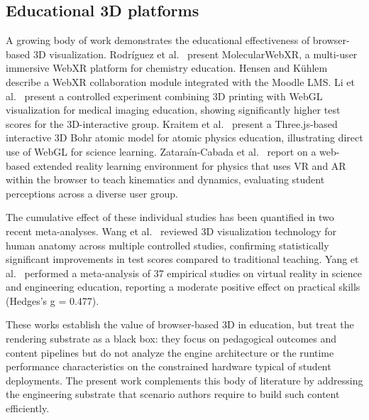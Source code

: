 \subsection{Educational 3D platforms}
A growing body of work demonstrates the educational effectiveness of browser-based 3D visualization. Rodríguez et al.~\cite{Rodrguez2021} present MolecularWebXR, a multi-user immersive WebXR platform for chemistry education. Hensen and Kühlem~\cite{Hensen2023} describe a WebXR collaboration module integrated with the Moodle LMS. Li et al.~\cite{Li2021} present a controlled experiment combining 3D printing with WebGL visualization for medical imaging education, showing significantly higher test scores for the 3D-interactive group. Kraitem et al.~\cite{Kraitem2025} present a Three.js-based interactive 3D Bohr atomic model for atomic physics education, illustrating direct use of WebGL for science learning. Zataraín-Cabada et al.~\cite{ZatarainCabada2022} report on a web-based extended reality learning environment for physics that uses VR and AR within the browser to teach kinematics and dynamics, evaluating student perceptions across a diverse user group.

The cumulative effect of these individual studies has been quantified in two recent meta-analyses. Wang et al.~\cite{Wang2024} reviewed 3D visualization technology for human anatomy across multiple controlled studies, confirming statistically significant improvements in test scores compared to traditional teaching. Yang et al.~\cite{Yang2024} performed a meta-analysis of 37 empirical studies on virtual reality in science and engineering education, reporting a moderate positive effect on practical skills (Hedges's g = 0.477).

These works establish the value of browser-based 3D in education, but treat the rendering substrate as a black box: they focus on pedagogical outcomes and content pipelines but do not analyze the engine architecture or the runtime performance characteristics on the constrained hardware typical of student deployments. The present work complements this body of literature by addressing the engineering substrate that scenario authors require to build such content efficiently.

